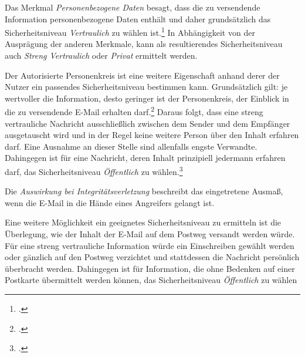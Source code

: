 \documentclass  [paper=a4,
				fontsize=12pt,
				listof=totoc,
				bibliography=totoc
				]{scrreprt}
\begin{document}
		
		Das Merkmal \textit{Personenbezogene Daten} besagt, dass die zu versendende Information personenbezogene Daten enthält und daher grundsätzlich das Sicherheitsniveau \textit{Vertraulich} zu wählen ist.\footcite[Vgl.][]{TSE} In Abhängigkeit von der Ausprägung der anderen Merkmale, kann als resultierendes Sicherheitsniveau auch \textit{Streng Vertraulich} oder \textit{Privat} ermittelt werden.
		
		
		Der Autorisierte Personenkreis ist eine weitere Eigenschaft anhand derer der Nutzer ein passendes Sicherheitsniveau bestimmen kann. Grundsätzlich gilt: je wertvoller die Information, desto geringer ist der Personenkreis, der Einblick in die zu versendende E-Mail erhalten darf.\footcite[Vgl.][]{TSE} Daraus folgt, dass eine streng vertrauliche Nachricht ausschließlich zwischen dem Sender und dem Empfänger ausgetauscht wird und in der Regel keine weitere Person über den Inhalt erfahren darf. Eine Ausnahme an dieser Stelle sind allenfalls engste Verwandte. Dahingegen ist für eine Nachricht, deren Inhalt prinzipiell jedermann erfahren darf, das Sicherheitsniveau \textit{Öffentlich} zu wählen.\footcite[Vgl.][S. 10]{ReinhausenGmbH}
		
		
		Die \textit{Auswirkung bei Integritätsverletzung} beschreibt das eingetretene Ausmaß, wenn die E-Mail in die Hände eines Angreifers gelangt ist.
		
		
		Eine weitere Möglichkeit ein geeignetes Sicherheitsniveau zu ermitteln ist die Überlegung, wie der Inhalt der E-Mail auf dem Postweg versandt werden würde. Für eine streng vertrauliche Information würde ein Einschreiben gewählt werden oder gänzlich auf den Postweg verzichtet und stattdessen die Nachricht persönlich überbracht werden. Dahingegen ist für Information, die ohne Bedenken  auf einer Postkarte übermittelt werden können, das Sicherheitsniveau \textit{Öffentlich} zu wählen 
		
\end{document}
